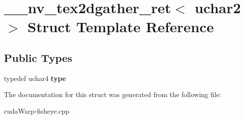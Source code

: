 \hypertarget{struct____nv__tex2dgather__ret_3_01uchar2_01_4}{}\section{\+\_\+\+\_\+nv\+\_\+tex2dgather\+\_\+ret$<$ uchar2 $>$ Struct Template Reference}
\label{struct____nv__tex2dgather__ret_3_01uchar2_01_4}
\subsection*{Public Types}
\begin{DoxyCompactItemize}
\item 
typedef uchar4 {\bfseries type}\hypertarget{struct____nv__tex2dgather__ret_3_01uchar2_01_4_aff444b5a72a8372fc4de7973b32f3a76}{}\label{struct____nv__tex2dgather__ret_3_01uchar2_01_4_aff444b5a72a8372fc4de7973b32f3a76}

\end{DoxyCompactItemize}


The documentation for this struct was generated from the following file\+:\begin{DoxyCompactItemize}
\item 
cuda\+Warp-\/fisheye.\+cpp\end{DoxyCompactItemize}
